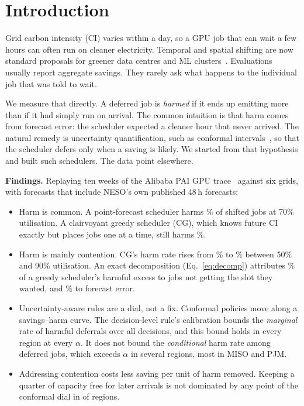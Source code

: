 \section{Introduction}\label{sec:intro}

Grid carbon intensity (CI) varies within a day, so a GPU job that can wait a few hours can often
run on cleaner electricity. Temporal and spatial shifting are now standard
proposals for greener data centres and ML clusters~\cite{wiesner2021wait,radovanovic2023carbon,xu2025green,hanafy2024gaia}.
Evaluations usually report aggregate savings. They rarely ask what happens to the individual job
that was told to wait.

We measure that directly. A deferred job is \emph{harmed} if it ends up emitting more than if it had
simply run on arrival. The common intuition is that harm comes from forecast error: the scheduler
expected a cleaner hour that never arrived. The natural remedy is uncertainty quantification, such as
conformal intervals~\cite{angelopoulos2023gentle,gibbs2021aci,li2024uncertainty}, so that the scheduler
defers only when a saving is likely. We started from that hypothesis and built such schedulers. The
data point elsewhere.

\textbf{Findings.} Replaying ten weeks of the Alibaba PAI GPU trace~\cite{weng2022mlaas} against six
grids, with forecasts that include NESO's own published 48\,h forecasts:
\begin{itemize}
\item Harm is common. A point-forecast scheduler harms \%
of shifted jobs at 70\% utilisation. A clairvoyant greedy scheduler (CG), which knows future CI
exactly but places jobs one at a time, still harms \%.
\item Harm is mainly contention. CG's harm rate rises from
\% to \%
between 50\% and 90\% utilisation. An exact decomposition (Eq.~\ref{eq:decomp}) attributes
\% of a greedy scheduler's harmful excess to jobs
not getting the slot they wanted, and \% to forecast error.
\item Uncertainty-aware rules are a dial, not a fix. Conformal policies move along a savings--harm
curve. The decision-level rule's calibration bounds the \emph{marginal} rate of harmful deferrals
over all decisions, and this bound holds in every region at every $\alpha$. It does not bound the
\emph{conditional} harm rate among deferred jobs, which exceeds $\alpha$ in several regions, most
in MISO and PJM.
\item Addressing contention costs less saving per unit of harm removed. Keeping a quarter of capacity free for
later arrivals is not dominated by any point of the conformal dial in  of
 regions.
\end{itemize}

